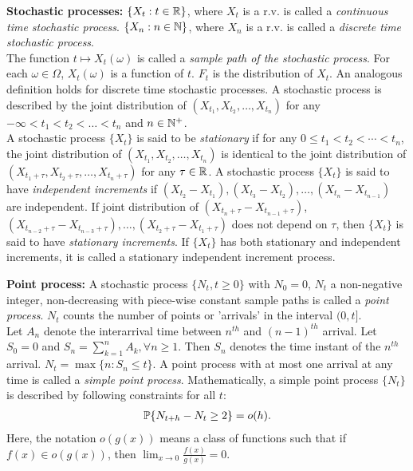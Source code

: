 \documentclass[all-lectures.tex]{subfiles}
\begin{document}
\textbf{Stochastic processes:} $\{X_t : t \in \R\}$, where $X_t$ is a r.v. is called a \textit{continuous time stochastic process}. $\{X_n : n \in \N\}$, where $X_n$ is a r.v. is called a \textit{discrete time stochastic process}. \\
\indent The function $t \mapsto X_t(\omega)$ is called a \textit{sample path of the stochastic process}. For each $\omega \in \Omega$, $X_t(\omega)$ is a function of $t$. $F_t$ is the distribution of $X_t$. An analogous definition holds for discrete time stochastic processes. A stochastic process is described by the joint distribution of $(X_{t_1},X_{t_2},\ldots,X_{t_n})$ for any  $-\infty < t_1 < t_2 < \ldots < t_n$ and $n \in \N^+$.\\
\indent A stochastic process $\{X_t\}$ is said to be \textit{stationary} if for any $0 \leq t_1 < t_2 < \cdots < t_n$, the joint distribution of $(X_{t_1},X_{t_2},\ldots,X_{t_n})$ is identical to the joint distribution of $(X_{t_1+\tau},X_{t_2+\tau},\ldots,X_{t_n+\tau})$ for any $\tau \in \R$. A stochastic process $\{X_t\}$ is said to have \textit{independent increments} if $(X_{t_2} - X_{t_1}), (X_{t_3} - X_{t_2}), \dots, (X_{t_n} - X_{t_{n-1}})$ are independent. If joint distribution of $(X_{t_n +\tau} - X_{t_{n-1}+\tau})$, $(X_{t_{n-2}+\tau} - X_{t_{n-3}+\tau}), \dots, (X_{t_2+\tau} - X_{t_1+\tau})$ does not depend on $\tau$, then $\{X_t\}$ is said to have \textit{stationary increments}. If $\{X_t\}$ has both stationary and independent increments, it is called a stationary independent increment process.%

\textbf{Point process:} A stochastic process $\{N_t, t \geq 0\}$ with $N_0 = 0$, $N_t$ a non-negative integer, non-decreasing with piece-wise constant sample paths is called a \textit{point process}. $N_t$ counts the number of points or 'arrivals' in the interval $(0,t]$. \\
\indent Let $A_n$ denote the interarrival time between $n^{th}$ and $(n-1)^{th}$ arrival. Let $S_0 = 0$ and $S_n = \sum^n_{k=1} A_k,  \forall n \geq 1$. Then $S_n$ denotes the time instant of the $n^{th}$ arrival. $N_t = \max\{n: S_n \leq t\}$. A point process with at most one arrival at any time is called a \textit{simple point process}. Mathematically, a simple point process $\{N_t\}$ is described by following constraints for all $t$:
\begin{align*}
\P\{N_{t+h} - N_t \geq  2 \} &= o(h).\\
\end{align*} 
Here, the notation $o(g(x))$ means a class of functions such that if $f(x) \in o(g(x))$, then $\lim_{x\rightarrow 0} \frac{f(x)}{g(x)} =0$.
\end{document}
